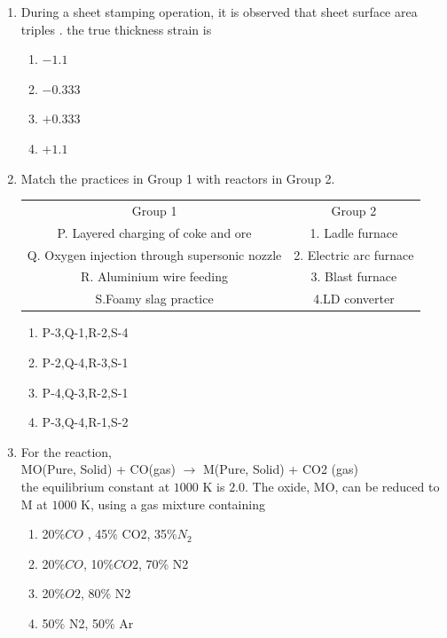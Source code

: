 \documentclass[journal]{IEEEtran}
\theoremstyle{remark}
\begin{document}
\begin{enumerate}
\item During a sheet stamping operation, it is observed that sheet surface area triples . the true thickness strain is  \hfill{}
\begin{multicols}{4}
\begin{enumerate}
\item $-1.1$
\item $-0.333$
\item $+0.333$
\item $+1.1$
\end{enumerate}
\end{multicols}
\item Match the practices in Group 1 with reactors in Group 2.\hfill{}
\begin{center}
\begin{tabular}{c c}
Group 1     &  Group 2\\
P. Layered charging of coke and ore     &1. Ladle furnace\\
Q. Oxygen injection through supersonic nozzle &2. Electric arc furnace\\ 
R. Aluminium wire feeding &3. Blast furnace\\
S.Foamy slag practice & 4.LD converter
\end{tabular}
\end{center}
\begin{multicols}{2}
\begin{enumerate}
\item P-3,Q-1,R-2,S-4
\item P-2,Q-4,R-3,S-1
\item P-4,Q-3,R-2,S-1
\item P-3,Q-4,R-1,S-2
\end{enumerate}
\end{multicols}

\item For the reaction,\\
MO(Pure, Solid) + CO(gas) $\longrightarrow$ M(Pure, Solid) + CO2 (gas)\\
the equilibrium constant at $1000$ K is $2.0$. The oxide, MO, can be reduced to M at $1000$ K, using a gas
mixture containing
\hfill{}
\begin{multicols}{2}
\begin{enumerate}
\item 20$\% CO$ , 45$\%$ CO2, 35$\% N_2$
\item  20$\% CO$, 10$\% CO2$, 70$\%$ N2
\item20$\% O2$, 80$\%$ N2
\item 50$\%$ N2, 50$\%$ Ar
\end{enumerate}
\end{multicols}


\end{enumerate}
\end{document}

